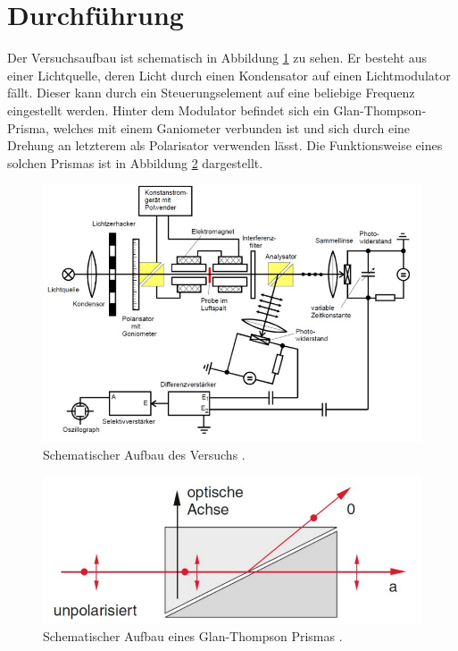 \section{Durchführung}
\label{sec:Durchführung}

Der Versuchsaufbau ist schematisch in Abbildung \ref{fig:aufbau} zu sehen. Er besteht aus einer Lichtquelle, deren Licht durch einen Kondensator auf einen 
Lichtmodulator fällt. Dieser kann durch ein Steuerungselement auf eine beliebige Frequenz eingestellt werden. Hinter dem Modulator befindet 
sich ein Glan-Thompson-Prisma, welches mit einem Ganiometer verbunden ist und sich durch eine Drehung an letzterem als Polarisator verwenden 
lässt. Die Funktionsweise eines solchen Prismas ist in Abbildung \ref{fig:prisma} dargestellt.

\begin{figure}
    \centering
    \includegraphics[scale=0.3]{content/Aufbau.png}
    \caption{Schematischer Aufbau des Versuchs \cite{anleitung}.}
    \label{fig:aufbau}
\end{figure}

\begin{figure}
    \centering
    \includegraphics[scale=0.3]{content/prisma.png}
    \caption{Schematischer Aufbau eines Glan-Thompson Prismas \cite{anleitung}.}
    \label{fig:prisma}
\end{figure}

